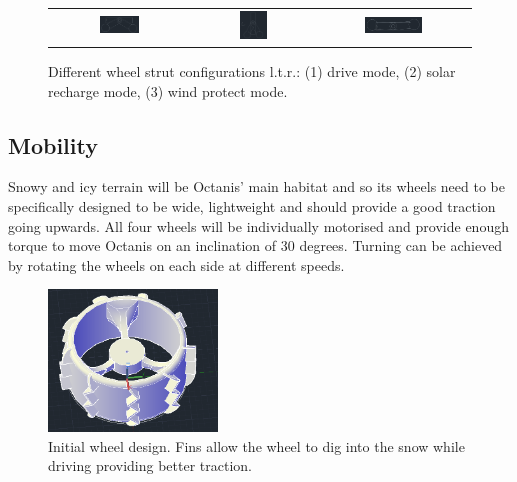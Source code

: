 \documentclass[a4paper,12pt]{article}
\begin{document}
\begin{figure}[h!]
\centering
\begin{tabular}{ c  c  c }
\includegraphics[width=0.3\textwidth]{drive} & \includegraphics[width=0.25\textwidth]{upright} & \includegraphics[width=0.4\textwidth]{flat} \\
\end{tabular}
\caption{Different wheel strut configurations l.t.r.: (1) drive mode, (2) solar recharge mode, (3) wind protect mode.}
\end{figure}


\subsection{Mobility}
Snowy and icy terrain will be Octanis' main habitat and so its wheels need to be specifically designed to be wide, lightweight and should provide a good traction going upwards. 
All four wheels will be individually motorised and provide enough torque to move Octanis on an inclination of 30 degrees. Turning can be achieved by rotating the wheels on each side at different speeds. 

\begin{figure}[h!]
	\centering
    \includegraphics[width=0.4\textwidth]{wheel}
    \caption{Initial wheel design. Fins allow the wheel to dig into the snow while driving providing better traction.}
\end{figure}
\end{document}

